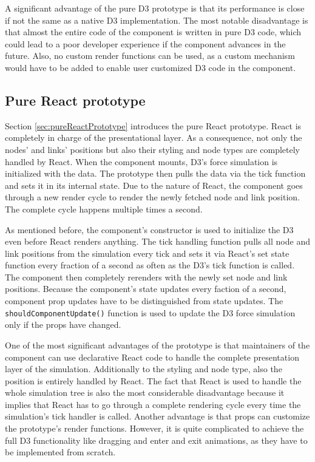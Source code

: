 A significant advantage of the pure D3 prototype is that its performance is close if not the same as a native D3 implementation. The most notable disadvantage is that almost the entire code of the component is written in pure D3 code, which could lead to a poor developer experience if the component advances in the future. Also, no custom render functions can be used, as a custom mechanism would have to be added to enable user customized D3 code in the component. 

\subsection{Pure React prototype}

Section \ref{sec:pureReactPrototype} introduces the pure React prototype. React is completely in charge of the presentational layer. As a consequence, not only the nodes' and links' positions but also their styling and node types are completely handled by React. When the component mounts, D3's force simulation is initialized with the data. The prototype then pulls the data via the tick function and sets it in its internal state. Due to the nature of React, the component goes through a new render cycle to render the newly fetched node and link position. The complete cycle happens multiple times a second.

As mentioned before, the component's constructor is used to initialize the D3 even before React renders anything. The tick handling function pulls all node and link positions from the simulation every tick and sets it via React's set state function every fraction of a second as often as the D3's tick function is called. The component then completely rerenders with the newly set node and link positions. Because the component's state updates every faction of a second, component prop updates have to be distinguished from state updates. The \texttt{shouldComponentUpdate()} function is used to update the D3 force simulation only if the props have changed.

One of the most significant advantages of the prototype is that maintainers of the component can use declarative React code to handle the complete presentation layer of the simulation. Additionally to the styling and node type, also the position is entirely handled by React. The fact that React is used to handle the whole simulation tree is also the most considerable disadvantage because it implies that React has to go through a complete rendering cycle every time the simulation's tick handler is called. Another advantage is that props can customize the prototype's render functions. However, it is quite complicated to achieve the full D3 functionality like dragging and enter and exit animations, as they have to be implemented from scratch. 

